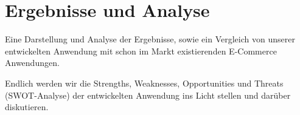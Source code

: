 \chapter{Ergebnisse und Analyse}

Eine Darstellung und Analyse der Ergebnisse, sowie ein Vergleich von unserer entwickelten Anwendung mit schon im Markt existierenden E-Commerce Anwendungen.


Endlich werden wir die Strengths, Weaknesses, Opportunities und Threats (SWOT-Analyse) der entwickelten Anwendung ins Licht stellen und darüber diskutieren. 
